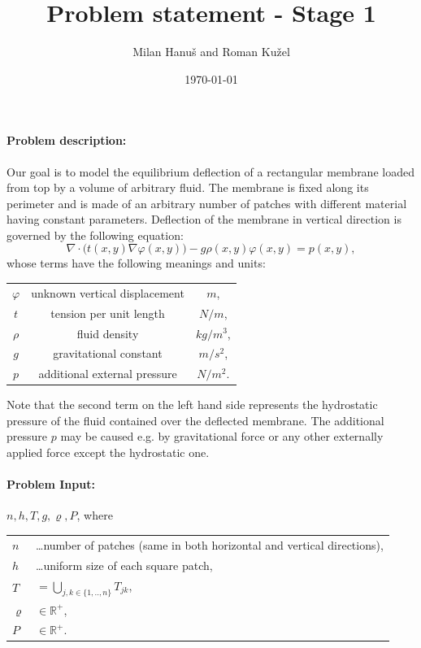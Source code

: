 \documentclass{article}
\title{Problem statement - Stage 1}
\author{Milan Hanu{\v s} and Roman Ku{\v z}el}
\date{\today}
\begin{document}
\maketitle
  
  
  
  \paragraph{Problem description:} 
  Our goal is to model the equilibrium deflection of a rectangular membrane loaded from top by a volume of arbitrary fluid. The membrane is fixed along its perimeter and is made of an arbitrary number of patches with different material having constant parameters. Deflection of the membrane in vertical direction is governed by the following equation:
$$
\nabla\cdot \bigl( t(x,y) \nabla \varphi(x,y) \bigr) - g\rho(x,y)\varphi(x,y) = p(x,y),
$$
whose terms have the following meanings and units:
\begin{center}
   \begin{tabular}{ccc}
  		$\varphi$ & unknown vertical displacement & $m$, \\
  		$t$ & tension per unit length & $N/m$,   \\
  		$\rho$ & fluid density & $kg/m^3$, \\
  		$g$ & gravitational constant & $m/s^2$, \\
  		$p$ & additional external pressure & $N/m^2$.
  \end{tabular}
\end{center}
Note that the second term on the left hand side represents the hydrostatic pressure of the fluid contained over the deflected membrane. The additional pressure $p$ may be caused e.g. by gravitational force or any other externally applied force except the hydrostatic one.\\[.2em]
  
  
 
  \paragraph{Problem Input:} $ n,h, T, g, \varrho, P $, where 
  
\begin{center}
   \begin{tabular}{ll}
  		$n$ & \ldots number of patches (same in both horizontal and vertical directions),\\
  		$h$ & \ldots uniform size of each square patch,\\
        $T$ &$= \bigcup_{j,k\in \{1,..,n\}}T_{jk}$, \\
  		$\varrho$ &$ \in \mathbb{R}^+$, \\
  		$P$ &$ \in \mathbb{R}^+$.\\
  \end{tabular}
  \end{center}
\end{document}
